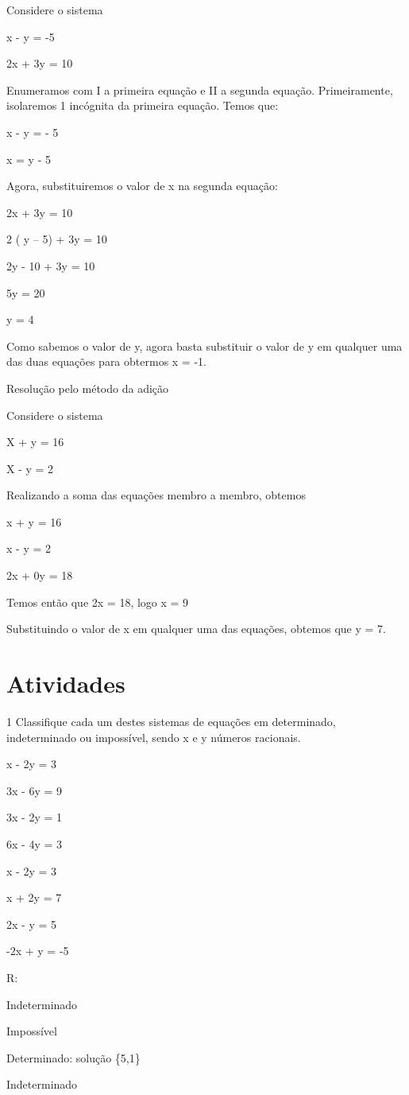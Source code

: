 {Considere o sistema

x - y = -5

2x + 3y = 10

Enumeramos com I a primeira equação e II a segunda equação.
Primeiramente, isolaremos 1 incógnita da primeira equação. Temos que:

x - y = - 5

x = y - 5

Agora, substituiremos o valor de x na segunda equação:

2x + 3y = 10

2 ( y -- 5) + 3y = 10

2y - 10 + 3y = 10

5y = 20

y = 4

Como sabemos o valor de y, agora basta substituir o valor de y em
qualquer uma das duas equações para obtermos x = -1.

Resolução pelo método da adição

Considere o sistema

X + y = 16

X - y = 2

Realizando a soma das equações membro a membro, obtemos

x + y = 16

x - y = 2

2x + 0y = 18

Temos então que 2x = 18, logo x = 9

Substituindo o valor de x em qualquer uma das equações, obtemos que y =
7.

\section{Atividades}

\num{1} Classifique cada um destes sistemas de equações em determinado,
indeterminado ou impossível, sendo x e y números racionais.
\item x - 2y = 3

3x - 6y = 9
\item 3x - 2y = 1

6x - 4y = 3
\item x - 2y = 3

x + 2y = 7
\item 2x - y = 5

-2x + y = -5

R:
\item Indeterminado
\item Impossível
\item Determinado: solução \{5,1\}
\item Indeterminado

}

